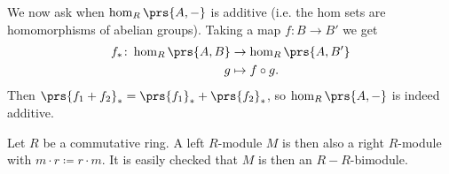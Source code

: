 \documentclass[11pt]{kbook}
\begin{document}
We now ask when $\hom_R\prs{A, -}$ is additive (i.e. the hom sets are homomorphisms of abelian groups). Taking a map $f \colon B \to B'$ we get
\begin{align*}
f_* \colon \hom_R\prs{A,B} &\to \hom_R\prs{A,B'} \\
g &\mapsto f \circ g \text{.}
\end{align*}
Then $\prs{f_1 + f_2}_* = \prs{f_1}_* + \prs{f_2}_*$, so $\hom_R\prs{A,-}$ is indeed additive.

\begin{example}
Let $R$ be a commutative ring. A left $R$-module $M$ is then also a right $R$-module with $m \cdot r \coloneqq r \cdot m$. It is easily checked that $M$ is then an $R-R$-bimodule.
\end{example}

\printbibliography
\end{document}
